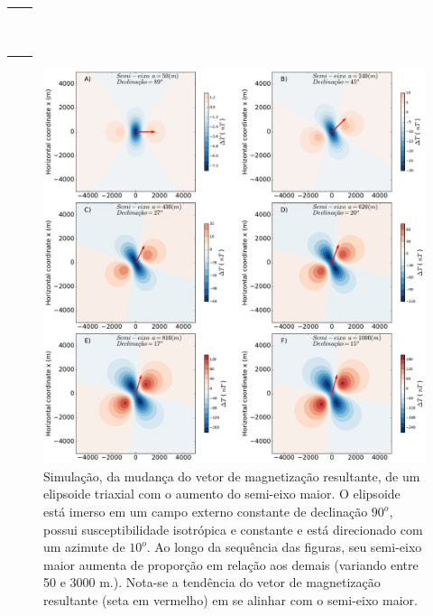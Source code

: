 \begin{table}[h!]
	\begin{center}
		\begin{tabular}{lc}
			
			&  \\
			& \\
			& \\
			&  \\
			& \\
			& \\
			& \\
			& \\
			& \\
			& \\

			
		\end{tabular}
	\end{center}
\end{table}

\begin{figure}[hbt!]
	\centering \includegraphics[width=16 cm,height=16 cm]{figures/ellipsoid_shape_iso}
	\caption[Simulação, da mudança do vetor de magnetização resultante, de um elipsoide triaxial com o aumento do semi-eixo maior.]{Simulação, da mudança do vetor de magnetização resultante, de um elipsoide triaxial com o aumento do semi-eixo maior. O elipsoide está imerso em um campo externo constante de declinação $90^o$, possui susceptibilidade isotrópica e constante e está direcionado com um azimute de $10^o$. Ao longo da sequência das figuras, seu semi-eixo maior aumenta de proporção em relação aos demais (variando entre 50 e 3000 m.). Nota-se a tendência do vetor de magnetização resultante (seta em vermelho) em se alinhar com o semi-eixo maior.}
	\label{fig:ellipsoid_shape_iso10}
\end{figure}

